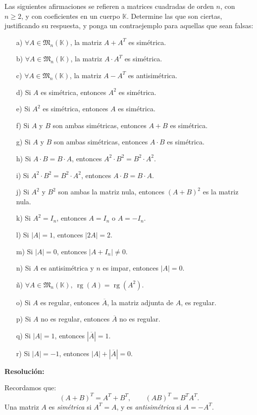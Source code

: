 \documentclass[a4paper,12pt]{article}
\begin{document}
\begin{ejercicio}[title=Ejercicio 42 (⋆)]
Las siguientes afirmaciones se refieren a matrices cuadradas de orden $n$, con $n \ge 2$, y con coeficientes en un cuerpo $\mathbb{K}$. Determine las que son ciertas, justificando su respuesta, y ponga un contraejemplo para aquellas que sean falsas:

\begin{enumerate}
\item[a)] $\forall A \in \mathfrak{M}_n(\mathbb{K})$, la matriz $A + A^T$ es simétrica.
\item[b)] $\forall A \in \mathfrak{M}_n(\mathbb{K})$, la matriz $A \cdot A^T$ es simétrica.
\item[c)] $\forall A \in \mathfrak{M}_n(\mathbb{K})$, la matriz $A - A^T$ es antisimétrica.
\item[d)] Si $A$ es simétrica, entonces $A^2$ es simétrica.
\item[e)] Si $A^2$ es simétrica, entonces $A$ es simétrica.
\item[f)] Si $A$ y $B$ son ambas simétricas, entonces $A + B$ es simétrica.
\item[g)] Si $A$ y $B$ son ambas simétricas, entonces $A \cdot B$ es simétrica.
\item[h)] Si $A \cdot B = B \cdot A$, entonces $A^2 \cdot B^2 = B^2 \cdot A^2$.
\item[i)] Si $A^2 \cdot B^2 = B^2 \cdot A^2$, entonces $A \cdot B = B \cdot A$.
\item[j)] Si $A^2$ y $B^2$ son ambas la matriz nula, entonces $(A + B)^2$ es la matriz nula.
\item[k)] Si $A^2 = I_n$, entonces $A = I_n$ o $A = -I_n$.
\item[l)] Si $|A| = 1$, entonces $|2A| = 2$.
\item[m)] Si $|A| = 0$, entonces $|A + I_n| \ne 0$.
\item[n)] Si $A$ es antisimétrica y $n$ es impar, entonces $|A| = 0$.
\item[ñ)] $\forall A \in \mathfrak{M}_n(\mathbb{K}),\ \operatorname{rg}(A) = \operatorname{rg}(A^2)$.
\item[o)] Si $A$ es regular, entonces $\overline{A}$, la matriz adjunta de $A$, es regular.
\item[p)] Si $A$ no es regular, entonces $\overline{A}$ no es regular.
\item[q)] Si $|A| = 1$, entonces $|\overline{A}| = 1$.
\item[r)] Si $|A| = -1$, entonces $|A| + |\overline{A}| = 0$.
\end{enumerate}

\tcblower
\textbf{Resolución:}

Recordamos que:
\[
(A+B)^T = A^T + B^T,\qquad
(AB)^T = B^T A^T.
\]
Una matriz $A$ es \emph{simétrica} si $A^T=A$, y es \emph{antisimétrica} si $A=-A^T$.

\end{ejercicio}
\end{document}
